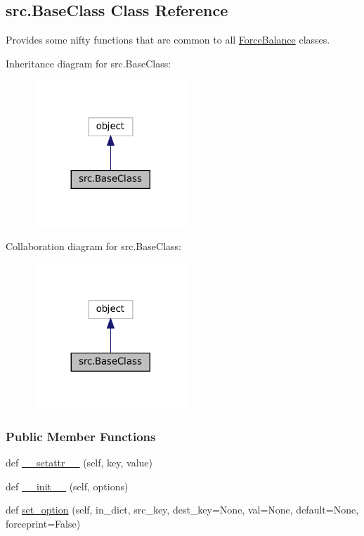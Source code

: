 \hypertarget{classsrc_1_1BaseClass}{}\subsection{src.\+Base\+Class Class Reference}
\label{classsrc_1_1BaseClass}


Provides some nifty functions that are common to all \hyperlink{namespaceForceBalance}{Force\+Balance} classes.  




Inheritance diagram for src.\+Base\+Class\+:
\nopagebreak
\begin{figure}[H]
\begin{center}
\leavevmode
\includegraphics[width=164pt]{classsrc_1_1BaseClass__inherit__graph}
\end{center}
\end{figure}


Collaboration diagram for src.\+Base\+Class\+:
\nopagebreak
\begin{figure}[H]
\begin{center}
\leavevmode
\includegraphics[width=164pt]{classsrc_1_1BaseClass__coll__graph}
\end{center}
\end{figure}
\subsubsection*{Public Member Functions}
\begin{DoxyCompactItemize}
\item 
def \hyperlink{classsrc_1_1BaseClass_a1cf3951ee0ae6fdfe0e989be84e2e4ef}{\+\_\+\+\_\+setattr\+\_\+\+\_\+} (self, key, value)
\item 
def \hyperlink{classsrc_1_1BaseClass_af1f90c74098fe511fcef0d6e2a57e7c9}{\+\_\+\+\_\+init\+\_\+\+\_\+} (self, options)
\item 
def \hyperlink{classsrc_1_1BaseClass_a4c2a542e94d4001156511f73f7fcb41d}{set\+\_\+option} (self, in\+\_\+dict, src\+\_\+key, dest\+\_\+key=None, val=None, default=None, forceprint=False)
\end{DoxyCompactItemize}
